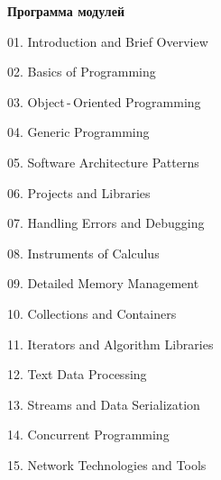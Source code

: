 \documentclass[a4paper,12pt]{article}
\renewenvironment{itemize}
{
    \begin{list}{\labelitemi}
    {
      \setlength{\topsep}{0pt}
      \setlength{\partopsep}{0pt}
      \setlength{\parskip}{0pt}
      \setlength{\itemsep}{0pt}
      \setlength{\parsep}{0pt}
      \setlength{\leftmargin}{14.5pt}
    }
}{\end{list}}
\begin{document}
\medskip
\medskip

\textbf{Программа модулей}

\medskip

\begin{itemize}
    
    \item 01. Introduction and Brief Overview

    \smallskip
    
    \item 02. Basics of Programming

    \smallskip
    
    \item 03. Object\,-\,Oriented Programming

    \smallskip
    
    \item 04. Generic Programming

    \smallskip
    
    \item 05. Software Architecture Patterns

    \smallskip
    
    \item 06. Projects and Libraries

    \smallskip
    
    \item 07. Handling Errors and Debugging

    \smallskip
    
    \item 08. Instruments of Calculus

    \smallskip
    
    \item 09. Detailed Memory Management

    \smallskip
    
    \item 10. Collections and Containers

    \smallskip
    
    \item 11. Iterators and Algorithm Libraries

    \smallskip
    
    \item 12. Text Data Processing

    \smallskip
    
    \item 13. Streams and Data Serialization

    \smallskip
    
    \item 14. Concurrent Programming

    \smallskip
    
    \item 15. Network Technologies and Tools
    
\end{itemize}
\end{document}
